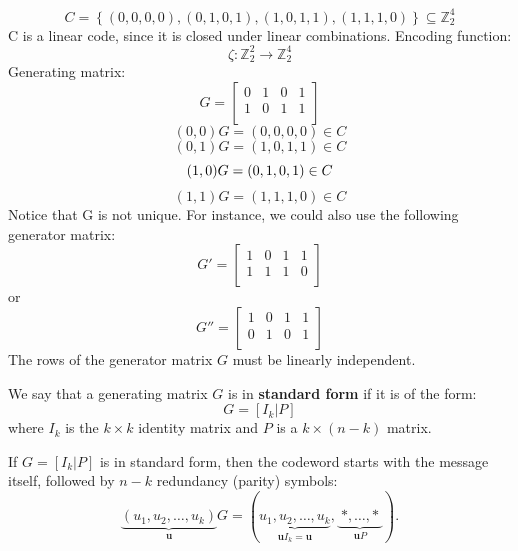 \documentclass[docmute]{article}
\begin{document}
\begin{example}
$$C = \left\{ (0, 0, 0, 0), (0, 1, 0, 1), (1, 0, 1, 1), (1, 1, 1, 0) \right\} \subseteq \mathbb{Z}_2^4$$
C is a linear code, since it is closed under linear combinations.
Encoding function:
$$\zeta: \mathbb{Z}_2^2 \to \mathbb{Z}_2^4$$
Generating matrix:
$$ G = 
\begin{bmatrix}
0 & 1 & 0 & 1 \\
1 & 0 & 1 & 1 \\
\end{bmatrix} $$
$$
(0, 0)G = (0, 0, 0, 0) \in C
$$
$$
(0, 1)G = (1, 0, 1, 1) \in C
$$
$$
(1, 0)G = (0, 1, 0, 1) \in C \\
$$
$$
(1, 1)G = (1, 1, 1, 0) \in C  
$$
Notice that G is not unique. For instance, we could also use the following generator matrix:
$$ G' = 
\begin{bmatrix}
1 & 0 & 1 & 1 \\
1 & 1 & 1 & 0 \\
\end{bmatrix} $$
or
$$ G'' = 
\begin{bmatrix}
1 & 0 & 1 & 1 \\
0 & 1 & 0 & 1 \\
\end{bmatrix} $$
The rows of the generator matrix $G$ must be linearly independent.
\end{example}

\begin{definition}
We say that a generating matrix $G$ is in \textbf{standard form} if it is of the form:
$$G = [I_k | P]$$
where $I_k$ is the $k \times k$ identity matrix and $P$ is a $k \times (n-k)$ matrix.
\end{definition}

\begin{remark}
If $G = [I_k | P]$ is in standard form, then the codeword starts with the message itself, followed by $n-k$ redundancy (parity) symbols:
$$\underbrace{(u_1, u_2, \dots, u_k)}_{\mathbf{u}} G = (\underbrace{u_1, u_2, \dots, u_k}_{\mathbf{u}I_k = \mathbf{u}}, \underbrace{\;\ast, \dots, \ast\;}_{\mathbf{u}P}).$$
\end{remark}
\end{document}
